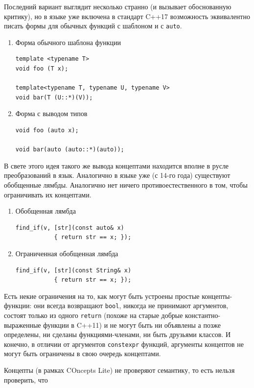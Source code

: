 \documentclass[a4paper,12pt,oneside]{book}
\begin{document}
Последний вариант выглядит несколько странно (и вызывает обоснованную критику), но в языке уже включена в стандарт C++17 возможность эквивалентно писать формы для обычных функций с шаблоном и с \lstinline!auto!.

\begin{enumerate}
\item Форма обычного шаблона функции 
\begin{lstlisting}
template <typename T> 
void foo (T x);

template<typename T, typename U, typename V> 
void bar(T (U::*)(V));
\end{lstlisting}
\item Форма с выводом типов
\begin{lstlisting}
void foo (auto x);

void bar(auto (auto::*)(auto));
\end{lstlisting}

\end{enumerate}

В свете этого идея такого же вывода концептами находится вполне в русле преобразований в язык. Аналогично в языке уже (с 14-го года) существуют обобщенные лямбды. Аналогично нет ничего противоестественного в том, чтобы ограничивать их концептами.

\begin{enumerate}
\item Обобщенная лямбда
\begin{lstlisting}
find_if(v, [str](const auto& x) 
           { return str == x; });
\end{lstlisting}
\item Ограниченная обобщенная лямбда
\begin{lstlisting}
find_if(v, [str](const String& x)
           { return str == x; });
\end{lstlisting}
\end{enumerate}

Есть некие ограничения на то, как могут быть устроены простые концепты-функции: они всегда возвращают \lstinline!bool!, никогда не принимают аргументов, состоят только из одного \lstinline!return! (похоже на старые добрые константно-выраженные функции в C++11) и не могут быть ни объявлены а позже определены, ни сделаны функциями-членами, ни быть друзьями классов. И конечно, в отличии от аргументов \lstinline!constexpr! функций, аргументы концептов не могут быть ограничены в свою очередь концептами.

Концепты (в рамках COncepts Lite) не проверяют семантику, то есть нельзя проверить, что
\end{document}

